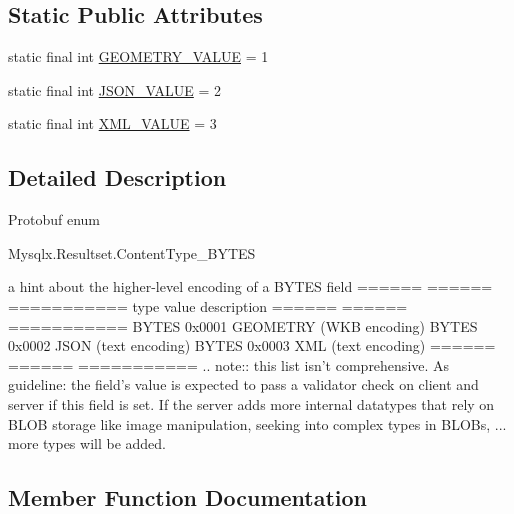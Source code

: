\subsection*{Static Public Attributes}
\begin{DoxyCompactItemize}
\item 
static final int \mbox{\hyperlink{enumcom_1_1mysql_1_1cj_1_1x_1_1protobuf_1_1_mysqlx_resultset_1_1_content_type___b_y_t_e_s_ab33597ac9ba091ef91e0a25e98d47b8b}{G\+E\+O\+M\+E\+T\+R\+Y\+\_\+\+V\+A\+L\+UE}} = 1
\item 
static final int \mbox{\hyperlink{enumcom_1_1mysql_1_1cj_1_1x_1_1protobuf_1_1_mysqlx_resultset_1_1_content_type___b_y_t_e_s_af38b5949b3d62070d0c88993b9a1f0dd}{J\+S\+O\+N\+\_\+\+V\+A\+L\+UE}} = 2
\item 
static final int \mbox{\hyperlink{enumcom_1_1mysql_1_1cj_1_1x_1_1protobuf_1_1_mysqlx_resultset_1_1_content_type___b_y_t_e_s_aadfad96a778ee358721f0eb095cb72a4}{X\+M\+L\+\_\+\+V\+A\+L\+UE}} = 3
\end{DoxyCompactItemize}


\subsection{Detailed Description}
Protobuf enum
\begin{DoxyCode}
Mysqlx.Resultset.ContentType\_BYTES 
\end{DoxyCode}



\begin{DoxyPre}
a hint about the higher-level encoding of a BYTES field
====== ====== ===========
type   value  description
====== ====== ===========
BYTES  0x0001 GEOMETRY (WKB encoding)
BYTES  0x0002 JSON (text encoding)
BYTES  0x0003 XML (text encoding)
====== ====== ===========
.. note::
  this list isn't comprehensive. As guideline: the field's value is expected
  to pass a validator check on client and server if this field is set.
  If the server adds more internal datatypes that rely on BLOB storage
  like image manipulation, seeking into complex types in BLOBs, ... more
  types will be added.
\end{DoxyPre}
 

\subsection{Member Function Documentation}
\mbox{\label{enumcom_1_1mysql_1_1cj_1_1x_1_1protobuf_1_1_mysqlx_resultset_1_1_content_type___b_y_t_e_s_a6fb51ec8d254769046b5e081c562aed3}} 
